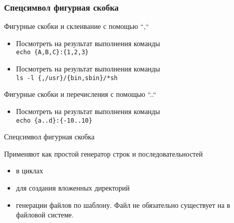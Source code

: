 \begin{frame}
	\frametitle{Спецсимвол фигурная скобка}

	\begin{block}{Фигурные скобки и склеивание с помощью ``,``}
		\begin{itemize}
			\item Посмотреть на результат выполнения команды \\
				{\tt echo \{A,B,C\}:\{1,2,3\}}
				\pause
			\item Посмотреть на результат выполнения команды \\
				{\tt ls -l \{,/usr\}/\{bin,sbin\}/*sh}
		\end{itemize}
	\end{block}

	\pause

	\begin{block}{Фигурные скобки и перечисления с помощью ``..``}
		\begin{itemize}
			\item Посмотреть на результат выполнения команды \\
				{\tt echo \{a..d\}:\{-10..10\}}
		\end{itemize}
	\end{block}

\end{frame}

\begin{frame}{Спецсимвол фигурная скобка}

Применяют как простой генератор строк и последовательностей
\begin{itemize}
    \item в циклах 
    \item для создания вложенных директорий 
    \item генерации файлов по шаблону. Файл не обязательно существует на в файловой системе.
\end{itemize}
    
\end{frame}
